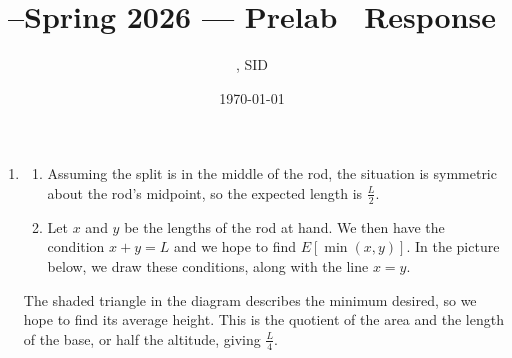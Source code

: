 \documentclass[11pt]{article}
\title{\Cls--Spring 2026 --- Prelab \Prelab \ Response}
\author{\Name, SID \SID}
\date{\today}
\begin{document}
\maketitle

\begin{enumerate}
    \item \begin{enumerate}
              \item Assuming the split is in the middle of the rod, the situation is symmetric about the rod's midpoint, so the expected length is $\frac{L}{2}$.
              \item Let $x$ and $y$ be the lengths of the rod at hand. We then have the condition $x+y = L$ and we hope to find $E[\min(x,y)]$. In the picture below, we draw these conditions, along with the line $x=y$.\\
                    \begin{center}
                    \end{center}
          \end{enumerate}
          The shaded triangle in the diagram describes the minimum desired, so we hope to find its average height. This is the quotient of the area and the length of the base, or half the altitude, giving $\frac{L}{4}$.
\end{enumerate}
\end{document}
